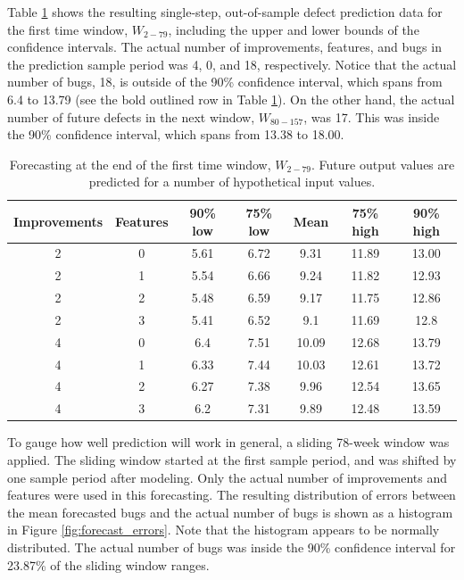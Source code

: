 \documentclass[letterpaper]{report}
\begin{document}
Table \ref{tab:forecasting_results} shows the resulting single-step, out-of-sample defect prediction data for the first time window, $W_{2-79}$, including the upper and lower bounds of the confidence intervals. The actual number of improvements, features, and bugs in the prediction sample period was 4, 0, and 18, respectively. Notice that the actual number of bugs, 18, is outside of the 90\% confidence interval, which spans from 6.4 to 13.79 (see the bold outlined row in Table \ref{tab:forecasting_results}). On the other hand, the actual number of future defects in the next window, $W_{80−157}$, was 17. This was inside the 90\% confidence interval, which spans from 13.38 to 18.00.

\begin{table}[htbp]
  \centering
  \begin{tabular}{ c | c | c | c | c | c | c }
    Improvements & Features & 90\% low & 75\% low & Mean & 75\% high & 90\% high \\
    \hline
2 & 0 & 5.61 & 6.72 & 9.31 & 11.89 & 13.00 \\
2 & 1 & 5.54 & 6.66 & 9.24 & 11.82 & 12.93 \\
2 & 2 & 5.48 & 6.59 & 9.17 & 11.75 & 12.86 \\
2 & 3 & 5.41 & 6.52 & 9.1 & 11.69 & 12.8 \\
4 & 0 & 6.4 & 7.51 & 10.09 & 12.68 & 13.79 \\
4 & 1 & 6.33 & 7.44 & 10.03 & 12.61 & 13.72 \\
4 & 2 & 6.27 & 7.38 & 9.96 & 12.54 & 13.65 \\
4 & 3 & 6.2 & 7.31 & 9.89 & 12.48 & 13.59 \\
    \hline
  \end{tabular}
\caption[Forecasting results]{Forecasting at the end of the first time window, $W_{2-79}$. Future output values are predicted for a number of hypothetical input values.}
\label{tab:forecasting_results}
\end{table}

To gauge how well prediction will work in general, a sliding 78-week window was applied. The sliding window started at the first sample period, and was shifted by one sample period after modeling. Only the actual number of improvements and features were used in this forecasting. The resulting distribution of errors between the mean forecasted bugs and the actual number of bugs is shown as a histogram in Figure \ref{fig:forecast_errors}. Note that the histogram appears to be normally distributed.  The actual number of bugs was inside the 90\% confidence interval for 23.87\% of the sliding window ranges.
\end{document}
